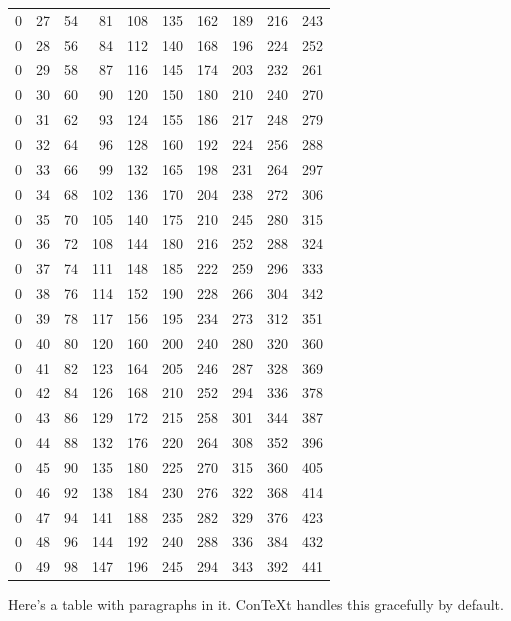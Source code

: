 \documentclass[11pt]{article}
\begin{document}
\begin{table}[htbp]
\begin{tabular}{rrrrrrrrrr}
0 & 27 & 54 & 81 & 108 & 135 & 162 & 189 & 216 & 243\\
0 & 28 & 56 & 84 & 112 & 140 & 168 & 196 & 224 & 252\\
0 & 29 & 58 & 87 & 116 & 145 & 174 & 203 & 232 & 261\\
0 & 30 & 60 & 90 & 120 & 150 & 180 & 210 & 240 & 270\\
0 & 31 & 62 & 93 & 124 & 155 & 186 & 217 & 248 & 279\\
0 & 32 & 64 & 96 & 128 & 160 & 192 & 224 & 256 & 288\\
0 & 33 & 66 & 99 & 132 & 165 & 198 & 231 & 264 & 297\\
0 & 34 & 68 & 102 & 136 & 170 & 204 & 238 & 272 & 306\\
0 & 35 & 70 & 105 & 140 & 175 & 210 & 245 & 280 & 315\\
0 & 36 & 72 & 108 & 144 & 180 & 216 & 252 & 288 & 324\\
0 & 37 & 74 & 111 & 148 & 185 & 222 & 259 & 296 & 333\\
0 & 38 & 76 & 114 & 152 & 190 & 228 & 266 & 304 & 342\\
0 & 39 & 78 & 117 & 156 & 195 & 234 & 273 & 312 & 351\\
0 & 40 & 80 & 120 & 160 & 200 & 240 & 280 & 320 & 360\\
0 & 41 & 82 & 123 & 164 & 205 & 246 & 287 & 328 & 369\\
0 & 42 & 84 & 126 & 168 & 210 & 252 & 294 & 336 & 378\\
0 & 43 & 86 & 129 & 172 & 215 & 258 & 301 & 344 & 387\\
0 & 44 & 88 & 132 & 176 & 220 & 264 & 308 & 352 & 396\\
0 & 45 & 90 & 135 & 180 & 225 & 270 & 315 & 360 & 405\\
0 & 46 & 92 & 138 & 184 & 230 & 276 & 322 & 368 & 414\\
0 & 47 & 94 & 141 & 188 & 235 & 282 & 329 & 376 & 423\\
0 & 48 & 96 & 144 & 192 & 240 & 288 & 336 & 384 & 432\\
0 & 49 & 98 & 147 & 196 & 245 & 294 & 343 & 392 & 441\\
\end{tabular}
\end{table}

Here's a table with paragraphs in it. ConTeXt handles this gracefully by
default.
\end{document}
